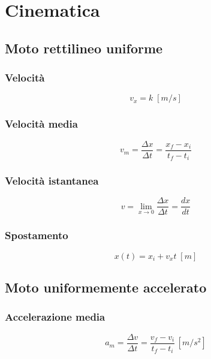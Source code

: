 \chapter*{Cinematica}

    \section*{Moto rettilineo uniforme}

        \subsection*{Velocità} 
            \begin{equation*}
                v_x = k \; [m/s]
            \end{equation*}

        \subsection*{Velocità media} 
            \begin{equation*}
                v_m = \frac{\Delta x}{\Delta t} = \frac{x_f - x_i}{t_f - t_i}
            \end{equation*}

        \subsection*{Velocità istantanea}
            \begin{equation*}
                v = \lim_{x \to 0}  \frac{\Delta x}{\Delta t} = \frac{dx}{dt}
            \end{equation*}

        \subsection*{Spostamento}
            \begin{equation*}
                x(t) = x_i + v_xt \; [m]
            \end{equation*}

    \section*{Moto uniformemente accelerato}

        \subsection*{Accelerazione media}
            \begin{equation*}
                a_m = \frac{\Delta v}{\Delta t} = \frac{v_f - v_i}{t_f - t_i} 
                \, [m/s^2]
            \end{equation*}

